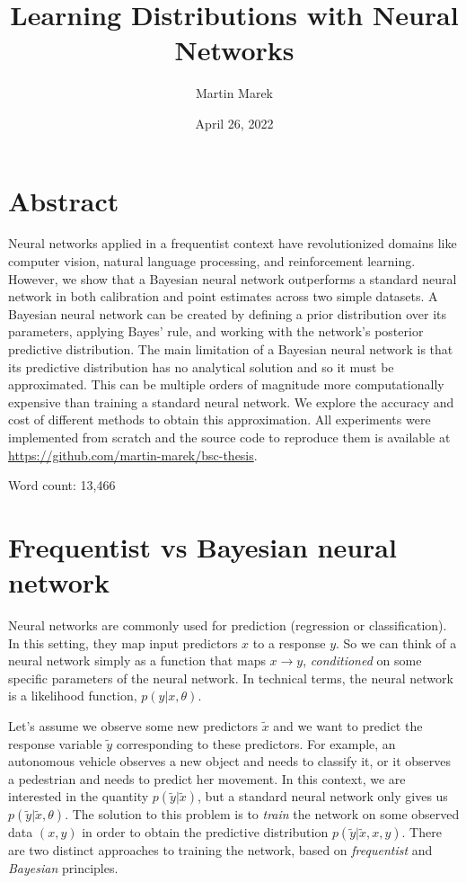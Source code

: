 \documentclass[12pt]{article}
\title{Learning Distributions with Neural Networks}
\author{Martin Marek}
\date{April 26, 2022}
\begin{document}
\maketitle

\vfill

\section*{Abstract}
Neural networks applied in a frequentist context have revolutionized domains like computer vision, natural language processing, and reinforcement learning. However, we show that a Bayesian neural network outperforms a standard neural network in both calibration and point estimates across two simple datasets. A Bayesian neural network can be created by defining a prior distribution over its parameters, applying Bayes' rule, and working with the network's posterior predictive distribution.  The main limitation of a Bayesian neural network is that its predictive distribution has no analytical solution and so it must be approximated. This can be multiple orders of magnitude more computationally expensive than training a standard neural network. We explore the accuracy and cost of different methods to obtain this approximation. All experiments were implemented from scratch and the source code to reproduce them is available at \url{https://github.com/martin-marek/bsc-thesis}.

\vfill

{\centering Word count: 13,466\par}

\vspace{2cm}
\newpage

\tableofcontents
\newpage

\section{Frequentist vs Bayesian neural network}
\label{sec_nn_vs_bnn}

Neural networks are commonly used for prediction (regression or classification). In this setting, they map input predictors $x$ to a response $y$. So we can think of a neural network simply as a function that maps $x \rightarrow y$, \textit{conditioned} on some specific parameters of the neural network. In technical terms, the neural network is a likelihood function, $p(y | x, \theta)$.

Let's assume we observe some new predictors $\tilde{x}$ and we want to predict the response variable $\tilde{y}$ corresponding to these predictors. For example, an autonomous vehicle observes a new object and needs to classify it, or it observes a pedestrian and needs to predict her movement. In this context, we are interested in the quantity $p(\tilde{y} | \tilde{x})$, but a standard neural network only gives us $p(\tilde{y} | \tilde{x}, \theta)$. The solution to this problem is to \textit{train} the network on some observed data $(x, y)$ in order to obtain the predictive distribution $p(\tilde{y} | \tilde{x}, x, y)$. There are two distinct approaches to training the network, based on \textit{frequentist} and \textit{Bayesian} principles.
\end{document}
